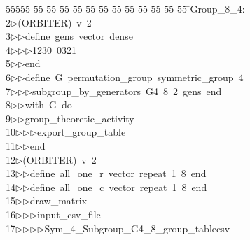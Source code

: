 %
%
\begin{tabbing}
55555 \= 55 \= 55 \= 55 \= 55 \= 55 \= 55 \= 55 \= 55 \= 55 \= 55 \= 55 \= 55 \= \>Group\_8\_4:\\[0pt]
2\>$\triangleright$\>(ORBITER)\ v\ 2\ \\[0pt]
3\>$\triangleright$\>$\triangleright$\>define\ gens\ vector\ dense\ \\[0pt]
4\>$\triangleright$\>$\triangleright$\>$\triangleright$\>1230\ 0321\ \\[0pt]
5\>$\triangleright$\>$\triangleright$\>end\ \\[0pt]
6\>$\triangleright$\>$\triangleright$\>define\ G\ permutation\_group\ symmetric\_group\ 4\ \\[0pt]
7\>$\triangleright$\>$\triangleright$\>$\triangleright$\>subgroup\_by\_generators\ G4\ 8\ 2\ gens\ end\ \\[0pt]
8\>$\triangleright$\>$\triangleright$\>with\ G\ do\ \\[0pt]
9\>$\triangleright$\>$\triangleright$\>group\_theoretic\_activity\ \\[0pt]
10\>$\triangleright$\>$\triangleright$\>$\triangleright$\>export\_group\_table\ \\[0pt]
11\>$\triangleright$\>$\triangleright$\>end\\[0pt]
12\>$\triangleright$\>(ORBITER)\ v\ 2\ \\[0pt]
13\>$\triangleright$\>$\triangleright$\>define\ all\_one\_r\ vector\ repeat\ 1\ 8\ end\ \\[0pt]
14\>$\triangleright$\>$\triangleright$\>define\ all\_one\_c\ vector\ repeat\ 1\ 8\ end\ \\[0pt]
15\>$\triangleright$\>$\triangleright$\>draw\_matrix\ \\[0pt]
16\>$\triangleright$\>$\triangleright$\>$\triangleright$\>input\_csv\_file\ \\[0pt]
17\>$\triangleright$\>$\triangleright$\>$\triangleright$\>$\triangleright$\>Sym\_4\_Subgroup\_G4\_8\_group\_tablecsv\ \\[0pt]

\end{tabbing}
